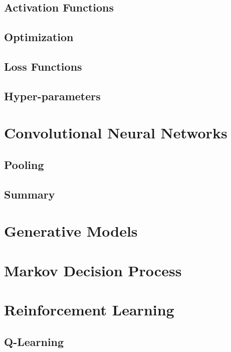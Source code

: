 \documentclass{uia}
\begin{document}
\subsection{Activation Functions}
\label{sec:bg:ann:activation}

\subsection{Optimization}
\label{sec:bg:ann:optimization}

\subsection{Loss Functions}
\label{sec:bg:ann:loss_functions}

\subsection{Hyper-parameters}
\label{sec:bg:ann:hyper_parameters}


\section{Convolutional Neural Networks}
\label{sec:bg:convnet}

\subsection{Pooling}
\label{sec:bg:convnet:pooling}

\subsection{Summary}
\label{sec:bg:convnet:summary}

\section{Generative Models}
\label{sec:bg:generative_models}


\section{Markov Decision Process}
\label{sec:bg:mdp}

\section{Reinforcement Learning}
\label{sec:bg:rl}


\subsection{Q-Learning}
\label{sec:bg:rl:ql}
\end{document}
